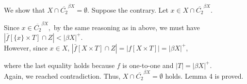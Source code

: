 \documentclass{article}
\begin{document}
\vskip 10pt

We show that $X\cap \overline{C_2}^{\beta X}=\emptyset$. Suppose the contrary. Let $x\in X \cap \overline{C_2}^{\beta X}$. 


Since $x\in \overline{C_2}^{\beta X},$ by the same reasoning as in above, we must have  $\left|\bar{f}\left[\{x\} \times T \right] \cap Z \right| < \left|\beta X \right|^+$. \\

However, since $x\in X$, $\left|\bar{f}\left[X \times T \right] \cap Z \right| =\left| f\left[X \times T \right]\right| = \left|\beta X \right|^+$, 


where the last equality holds because $f$ is one-to-one and $|T|=|\beta X|^+$.\\
Again, we reached contradiction. Thus, $X\cap \overline{C_2}^{\beta X}=\emptyset$ holds. Lemma 4 is proved. 
\end{document}
